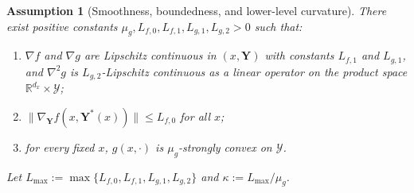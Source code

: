 \documentclass[10pt,a4paper]{amsart}
\newtheorem{assumption}{Assumption}
\begin{document}
\begin{assumption}[Smoothness, boundedness, and lower-level curvature]
\label{as:A1}
There exist positive constants $\mu_g,L_{f,0},L_{f,1},L_{g,1},L_{g,2}>0$ such that:
\begin{enumerate}[leftmargin=1.5em,label=\arabic*.,topsep=1pt,itemsep=1pt,parsep=0pt,partopsep=0pt]
    \item $\nabla f$ and $\nabla g$ are Lipschitz continuous in $(x,\boldsymbol Y)$ with constants $L_{f,1}$ and $L_{g,1}$, and $\nabla^2 g$ is $L_{g,2}$-Lipschitz continuous as a linear operator on the product space $\mathbb R^{d_x}\times\mathcal Y$;
    \item $\|\nabla_{\boldsymbol Y} f(x,\boldsymbol Y^*(x))\|\le L_{f,0}$ for all $x$;
    \item for every fixed $x$, $g(x,\cdot)$ is $\mu_g$-strongly convex on $\mathcal Y$.
\end{enumerate}
Let $L_{\max}:=\max\{L_{f,0},L_{f,1},L_{g,1},L_{g,2}\}$ and $\kappa:=L_{\max}/\mu_g$.
\end{assumption}
\end{document}
